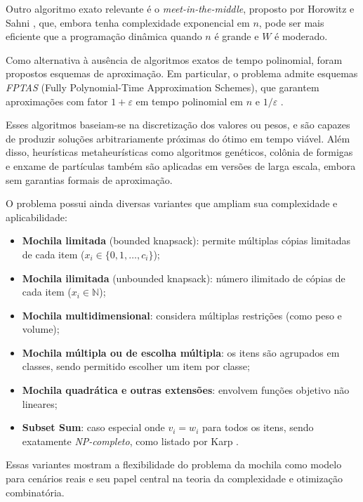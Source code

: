 Outro algoritmo exato relevante é o \textit{meet-in-the-middle}, proposto por Horowitz e Sahni \cite{horowitz1974}, que, embora tenha complexidade exponencial em $n$, pode ser mais eficiente que a programação dinâmica quando $n$ é grande e $W$ é moderado.

Como alternativa à ausência de algoritmos exatos de tempo polinomial, foram propostos esquemas de aproximação. Em particular, o problema admite esquemas \textit{FPTAS} (Fully Polynomial-Time Approximation Schemes), que garantem aproximações com fator $1 + \varepsilon$ em tempo polinomial em $n$ e $1/\varepsilon$ \cite{ibarra1975,jin2019}.

Esses algoritmos baseiam-se na discretização dos valores ou pesos, e são capazes de produzir soluções arbitrariamente próximas do ótimo em tempo viável. Além disso, heurísticas metaheurísticas como algoritmos genéticos, colônia de formigas e enxame de partículas também são aplicadas em versões de larga escala, embora sem garantias formais de aproximação.

O problema possui ainda diversas variantes que ampliam sua complexidade e aplicabilidade:
\begin{itemize}
    \item \textbf{Mochila limitada} (bounded knapsack): permite múltiplas cópias limitadas de cada item ($x_i \in \{0, 1, \dots, c_i\}$);
    \item \textbf{Mochila ilimitada} (unbounded knapsack): número ilimitado de cópias de cada item ($x_i \in \mathbb{N}$);
    \item \textbf{Mochila multidimensional}: considera múltiplas restrições (como peso e volume);
    \item \textbf{Mochila múltipla ou de escolha múltipla}: os itens são agrupados em classes, sendo permitido escolher um item por classe;
    \item \textbf{Mochila quadrática e outras extensões}: envolvem funções objetivo não lineares;
    \item \textbf{Subset Sum}: caso especial onde $v_i = w_i$ para todos os itens, sendo exatamente \textit{NP-completo}, como listado por Karp \cite{karp1972}.
\end{itemize}

Essas variantes mostram a flexibilidade do problema da mochila como modelo para cenários reais e seu papel central na teoria da complexidade e otimização combinatória.
